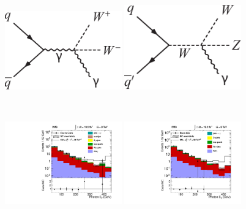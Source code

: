 \begin{figure}[p]
    \centering
    \includegraphics[width=0.45\textwidth]{figures/ss-inclboson-triboson-wvg-diagram1.pdf}
    \includegraphics[width=0.45\textwidth]{figures/ss-inclboson-triboson-wvg-diagram2.pdf}
    \caption{~\cite{Chatrchyan:2014bza}}
    \label{fig:ss-inclboson-triboson-wvg-diagrams}
\end{figure}
\begin{figure}[p]
    \centering
    \includegraphics[width=0.45\textwidth]{figures/ss-inclboson-triboson-wvg-ele-cms8tev.pdf}
    \includegraphics[width=0.45\textwidth]{figures/ss-inclboson-triboson-wvg-mu-cms8tev.pdf}
    \caption{~\cite{Chatrchyan:2014bza}}
    \label{fig:ss-inclboson-triboson-wvg-cms8tev}
\end{figure}

